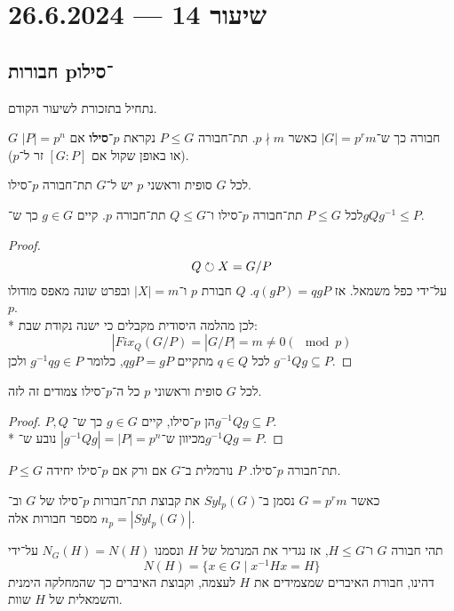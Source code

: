 \section{שיעור 14 --- 26.6.2024}
\subsection{חבורות p־סילו}
נתחיל בתזכורת לשיעור הקודם.
\begin{definition}
	$G$ חבורה כך ש־$|G| = p^r m$ כאשר $p \nmid m$. תת־חבורה $P \le G$ נקראת \textbf{$p$־סילו} אם $|P| = p^n$ (או באופן שקול אם $[G : P]$ זר ל־$p$).
\end{definition}
\begin{theorem}
	לכל $G$ סופית וראשני $p$ יש ל־$G$ תת־חבורה $p$־סילו.
\end{theorem}
\begin{proposition}
	לכל $P \le G$ תת־חבורה $p$־סילו ו־$Q \le G$ תת־חבורה $p$. קיים $g \in G$ כך ש־$g Q g^{-1} \le P$.
\end{proposition}
\begin{proof}
	\[
		Q \circlearrowright X = G / P
	\]
	על־ידי כפל משמאל.
	אז $q (gP) = qg P$.
	$Q$ חבורת $p$ ו־$|X| = m$ ובפרט שונה מאפס מודולו $p$. \\*
	לכן מהלמה היסודית מקבלים כי ישנה נקודת שבת:
	\[
		|Fix_Q(G/P) = |G/P| = m \ne 0 (\mod p)
	\]
	לכל $q \in Q$ מתקיים $qg P = gP$, כלומר $g^{-1} q g \in P$ ולכן $g^{-1} Q g \subseteq P$.
\end{proof}
\begin{theorem}
	לכל $G$ סופית וראשוני $p$ כל ה־$p$־סילו צמודים זה לזה.
\end{theorem}
\begin{proof}
	$P, Q$ הן $p$־סילו, קיים $g \in G$ כך ש־$g^{-1} Q g \subseteq P$. \\*
	מכיוון ש־$|g^{-1} Q g| = |P| = p^n$ נובע ש־$g^{-1} Q g = P$.
\end{proof}
\begin{conclusion}
	$P \le G$ תת־חבורה $p$־סילו.
	$P$ נורמלית ב־$G$ אם ורק אם $p$־סילו יחידה.
\end{conclusion}
כאשר $G = p^r m$ נסמן ב־$Syl_p(G)$ את קבוצת תת־חבורות $p$־סילו של $G$ וב־$n_p = |Syl_p(G)|$ מספר חבורות אלה.
\begin{definition}[מנרמל]
	תהי חבורה $G$ ו־$H \le G$, אז נגדיר את המנרמל של $H$ ונסמנו $N_G(H) = N(H)$ על־ידי
	\[
		N(H) = \{ x \in G \mid x^{-1} H x = H \}
	\]
	דהינו, חבורת האיברים שמצמידים את $H$ לעצמה, וקבוצת האיברים כך שהמחלקה הימנית והשמאלית של $H$ שוות.
\end{definition}
